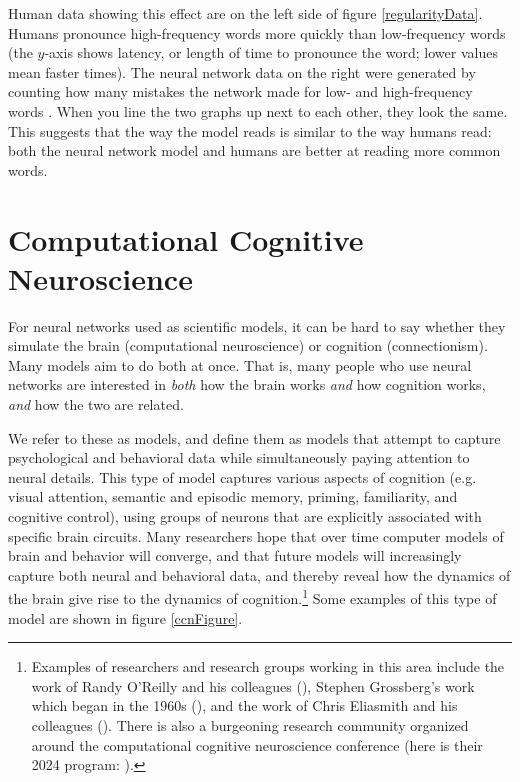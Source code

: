 Human data showing this effect are on the left side of figure \ref{regularityData}. Humans pronounce high-frequency words more quickly than low-frequency words (the $y$-axis shows latency, or length of time to pronounce the word; lower values mean faster times). The neural network data on the right were generated by counting how many mistakes the network made for low- and high-frequency words \cite{seidenberg1989distributed}. When you line the two graphs up next to each other, they look the same. This suggests that the way the model reads is similar to the way humans read: both the neural network model and humans are better at reading more common words.

\section{Computational Cognitive Neuroscience}\label{ccn}

For neural networks used as scientific models, it can be hard to say whether they simulate the brain (computational neuroscience) or cognition (connectionism). Many models aim to do both at once. That is, many people who use neural networks are interested in \emph{both} how the brain works \emph{and} how cognition works, \emph{and} how the two are related.

We refer to these as  models, and define them as models that attempt to capture psychological and behavioral data while simultaneously paying attention to neural details. This type of model captures various aspects of cognition (e.g. visual attention, semantic and episodic memory, priming, familiarity, and cognitive control), using groups of neurons that are explicitly associated with specific brain circuits. Many researchers hope that over time computer models of brain and behavior will converge, and that future models will increasingly capture both neural and behavioral data, and thereby reveal how the dynamics of the brain give rise to the dynamics of cognition.\footnote{Examples of researchers and research groups working in this area include the work of Randy O'Reilly and his colleagues (), Stephen Grossberg's work which began in the 1960s (), and the work of Chris Eliasmith and his colleagues (). There is also a burgeoning research community organized around the computational cognitive neuroscience conference (here is their 2024 program: ).} Some examples of this type of model are shown in figure \ref{ccnFigure}.

